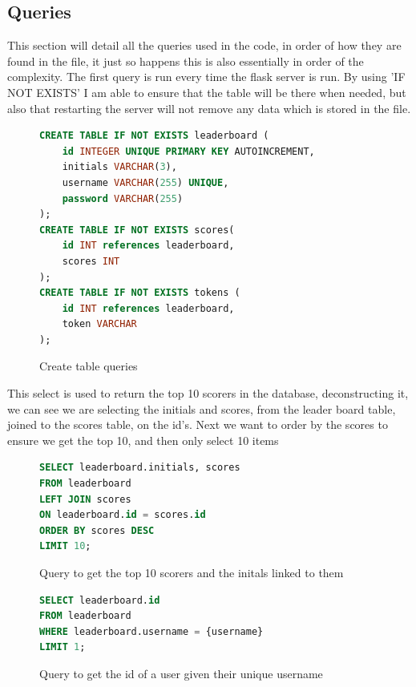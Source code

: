 \subsection{Queries}
This section will detail all the queries used in the code, in order of how they are found in the file, it just so happens this is also essentially in order of the complexity. The first query is run every time the flask server is run. By using 'IF NOT EXISTS' I am able to ensure that the table will be there when needed, but also that restarting the server will not remove any data which is stored in the file. 

\begin{figure}[H]
    \begin{lstlisting}[language=SQL, style=mystyle1]
CREATE TABLE IF NOT EXISTS leaderboard (
    id INTEGER UNIQUE PRIMARY KEY AUTOINCREMENT,
    initials VARCHAR(3),
    username VARCHAR(255) UNIQUE,
    password VARCHAR(255)
);
CREATE TABLE IF NOT EXISTS scores(
    id INT references leaderboard,
    scores INT
);
CREATE TABLE IF NOT EXISTS tokens (
    id INT references leaderboard,
    token VARCHAR
);
    \end{lstlisting}
      \centering
      \caption{Create table queries}
      \label{fig:SQL1}
\end{figure}

This select is used to return the top 10 scorers in the database, deconstructing it, we can see we are selecting the initials and scores, from the leader board table, joined to the scores table, on the id's. Next we want to order by the scores to ensure we get the top 10, and then only select 10 items
\begin{figure}[H]
    \begin{lstlisting}[language=SQL, style=mystyle1]
SELECT leaderboard.initials, scores
FROM leaderboard
LEFT JOIN scores
ON leaderboard.id = scores.id
ORDER BY scores DESC
LIMIT 10;
    \end{lstlisting}
      \centering
      \caption{Query to get the top 10 scorers and the initals linked to them}
      \label{fig:SQL2}
\end{figure}


\begin{figure}[H]
    \begin{lstlisting}[language=SQL, style=mystyle1]
SELECT leaderboard.id
FROM leaderboard
WHERE leaderboard.username = {username}
LIMIT 1;
    \end{lstlisting}
      \centering
      \caption{Query to get the id of a user given their unique username}
      \label{fig:SQL3}
\end{figure}

